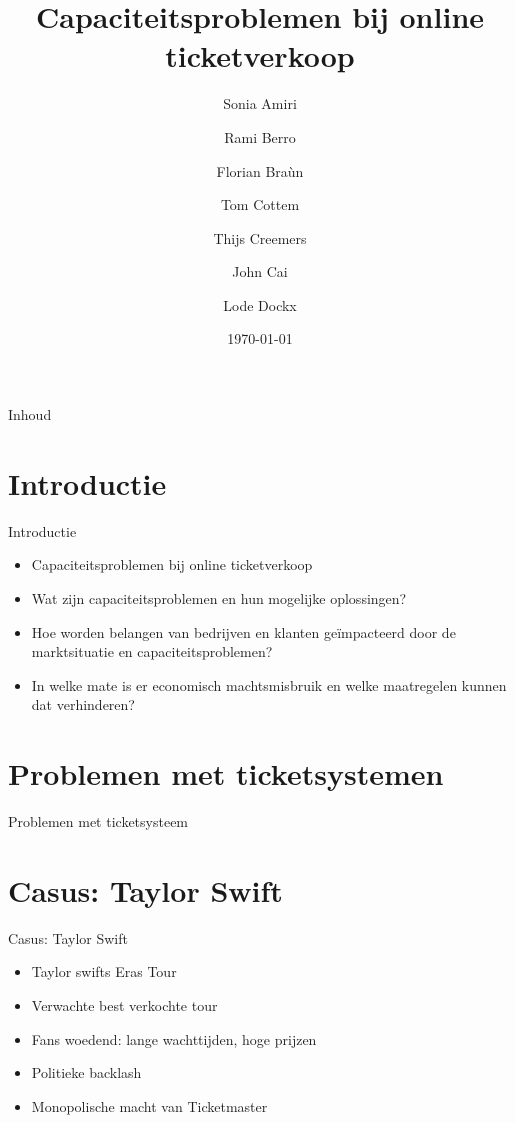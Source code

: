 \documentclass{beamer}
\title{Capaciteitsproblemen bij online ticketverkoop}
\author{Sonia Amiri \and Rami Berro \and Florian Braùn \and Tom Cottem \and Thijs Creemers \and John Cai \and Lode Dockx}
\date{\today}
\begin{document}
\begin{frame}
  \titlepage
\end{frame}

\begin{frame}{Inhoud}
  \tableofcontents
\end{frame}

\section{Introductie}
\begin{frame}{Introductie}
    \begin{itemize}
        \item Capaciteitsproblemen bij online ticketverkoop
        \item Wat zijn capaciteitsproblemen en hun mogelijke oplossingen?
        \item Hoe worden belangen van bedrijven en klanten geïmpacteerd door de marktsituatie en capaciteitsproblemen?
        \item In welke mate is er economisch machtsmisbruik en welke maatregelen kunnen dat verhinderen?
    \end{itemize}
\end{frame}

\section{Problemen met ticketsystemen}
\begin{frame}{Problemen met ticketsysteem}
    
\end{frame}

\section{Casus: Taylor Swift} %
\begin{frame}{Casus: Taylor Swift}
    \begin{itemize}
        \item Taylor swifts Eras Tour
        \item Verwachte best verkochte tour
        \item Fans woedend: lange wachttijden, hoge prijzen
        \item Politieke backlash
        \item Monopolische macht van Ticketmaster
    \end{itemize}
\end{frame}
\end{document}
